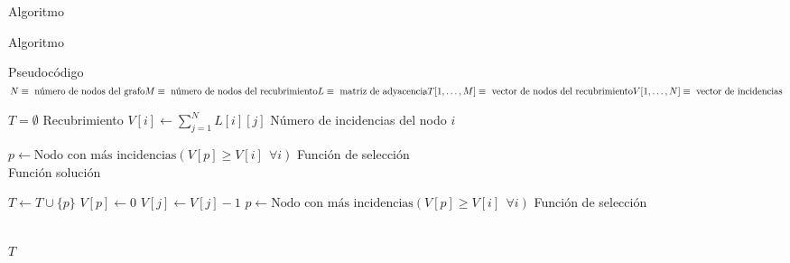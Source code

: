 \documentclass[spanish]{beamer}
\begin{document}
\begin{frame}{Algoritmo}
	
\end{frame}

\begin{frame}{Algoritmo}
	
\end{frame}

\begin{frame}{Pseudocódigo}
$N \equiv \text{ número de nodos del grafo}\\ M \equiv \text{ número de nodos del recubrimiento}\\ L \equiv \text{ matriz de adyacencia}\\ T[1,\dots,M] \equiv \text{ vector de nodos del recubrimiento}\\ V[1,\dots,N] \equiv \text{ vector de incidencias}$\\

\begin{algorithm}
\begin{algorithmic}


    \State $T = \emptyset$ \Comment Recubrimiento
        \State $\displaystyle V[i] \gets \sum_{j=1}^N L[i][j]$ \Comment Número de incidencias del nodo $i$
    \EndFor

    \State $p \gets \text{Nodo con más incidencias} \left( V[p] \ge V[i] \ \ \forall i \right)$ \Comment Función de selección \\

     \Comment Función solución

        \State $T \gets T \cup \{p\}$
        \State $V[p] \gets 0$
                \State $V[j] \gets V[j]-1$
            \EndIf
        \EndFor
        \State $p \gets \text{Nodo con más incidencias} \left( V[p] \ge V[i] \ \ \forall i \right)$ \Comment Función de selección

    \EndWhile \\
    \State \Return $T$
\EndFunction
\end{algorithmic}
\end{algorithm}

\end{frame}
\end{document}
